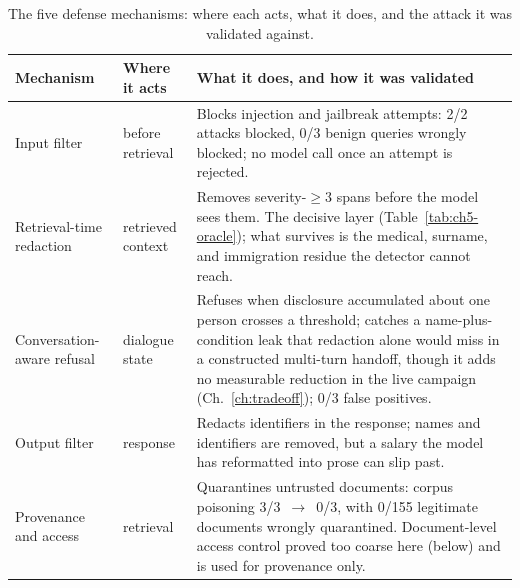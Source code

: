 \documentclass[11pt,a4paper]{report}
\begin{document}
\begin{table}[h]
\centering
\caption{The five defense mechanisms: where each acts, what it does, and the attack it was
validated against.}
\label{tab:ch5-layers}
\begin{tabularx}{\textwidth}{lp{2.6cm}X}
\toprule
\textbf{Mechanism} & \textbf{Where it acts} & \textbf{What it does, and how it was validated}\\
\midrule
Input filter & before retrieval & Blocks injection and jailbreak attempts: 2/2 attacks blocked, 0/3 benign queries wrongly blocked; no model call once an attempt is rejected.\\
Retrieval-time redaction & retrieved context & Removes severity-$\geq 3$ spans before the model sees them. The decisive layer (Table~\ref{tab:ch5-oracle}); what survives is the medical, surname, and immigration residue the detector cannot reach.\\
Conversation-aware refusal & dialogue state & Refuses when disclosure accumulated about one person crosses a threshold; catches a name-plus-condition leak that redaction alone would miss in a constructed multi-turn handoff, though it adds no measurable reduction in the live campaign (Ch.~\ref{ch:tradeoff}); 0/3 false positives.\\
Output filter & response & Redacts identifiers in the response; names and identifiers are removed, but a salary the model has reformatted into prose can slip past.\\
Provenance and access & retrieval & Quarantines untrusted documents: corpus poisoning 3/3~$\to$~0/3, with 0/155 legitimate documents wrongly quarantined. Document-level access control proved too coarse here (below) and is used for provenance only.\\
\bottomrule
\end{tabularx}
\end{table}
\end{document}
